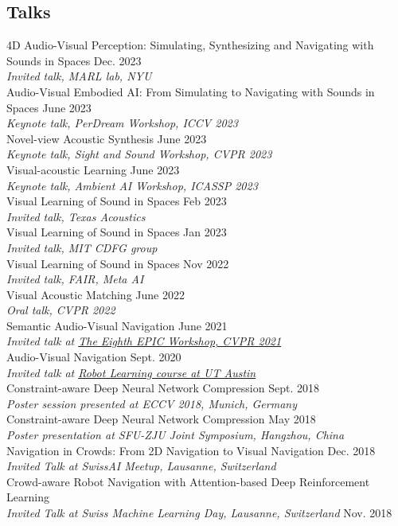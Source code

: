 \documentclass[margin, 10pt]{res} %
\begin{document}
\begin{resume}
\section{Talks}
4D Audio-Visual Perception: Simulating, Synthesizing and Navigating with Sounds in Spaces \hfill Dec. 2023 \\
\textit{\footnotesize{Invited talk, MARL lab, NYU}} \\
Audio-Visual Embodied AI: From Simulating to Navigating with Sounds in Spaces \hfill June 2023 \\
\textit{\footnotesize{Keynote talk, PerDream Workshop, ICCV 2023}} \\
Novel-view Acoustic Synthesis \hfill June 2023 \\
\textit{\footnotesize{Keynote talk, Sight and Sound Workshop, CVPR 2023}} \\
Visual-acoustic Learning \hfill June 2023 \\
\textit{\footnotesize{Keynote talk, Ambient AI Workshop, ICASSP 2023}} \\
Visual Learning of Sound in Spaces \hfill Feb 2023 \\
\textit{\footnotesize{Invited talk, Texas Acoustics}} \\
Visual Learning of Sound in Spaces \hfill Jan 2023 \\
\textit{\footnotesize{Invited talk, MIT CDFG group}} \\
Visual Learning of Sound in Spaces \hfill Nov 2022 \\
\textit{\footnotesize{Invited talk, FAIR, Meta AI}} \\
Visual Acoustic Matching \hfill June 2022 \\
\textit{\footnotesize{Oral talk, CVPR 2022}} \\
Semantic Audio-Visual Navigation \hfill June 2021 \\
\textit{\footnotesize{Invited talk at \href{https://eyewear-computing.org/EPIC_CVPR21/program}{The Eighth EPIC Workshop, CVPR 2021}}}\\
Audio-Visual Navigation \hfill Sept. 2020 \\
\textit{\footnotesize{Invited talk at \href{https://www.cs.utexas.edu/~yukez/cs391r_fall2020/}{Robot Learning course at UT Austin}}} \\
Constraint-aware Deep Neural Network Compression  \hfill Sept. 2018 \\
\textit{\footnotesize{Poster session presented at ECCV 2018, Munich, Germany}} \\
Constraint-aware Deep Neural Network Compression \hfill May 2018 \\
\textit{\footnotesize{Poster presentation at SFU-ZJU Joint Symposium, Hangzhou, China}} \\
Navigation in Crowds: From 2D Navigation to Visual Navigation \hfill Dec. 2018 \\
\textit{\footnotesize{Invited Talk at SwissAI Meetup, Lausanne, Switzerland}} \\
Crowd-aware Robot Navigation with Attention-based Deep Reinforcement Learning \\
\textit{\footnotesize{Invited Talk at Swiss Machine Learning Day, Lausanne, Switzerland}} \hfill Nov. 2018 



\end{resume}
\end{document}
